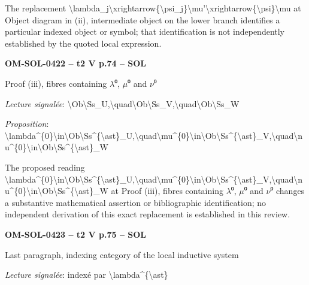 The replacement \textbackslash{}lambda\_j\textbackslash{}xrightarrow\{\textbackslash{}psi\_j\}\textbackslash{}mu'\textbackslash{}xrightarrow\{\textbackslash{}psi\}\textbackslash{}mu at Object diagram in (ii), intermediate object on the lower branch identifies a particular indexed object or symbol; that identification is not independently established by the quoted local expression.\par
\par\noindent\textbf{OM-SOL-0422 -- t2 V p.74 -- SOL}\par
Proof (iii), fibres containing \ensuremath{\lambda}⁰, \ensuremath{\mu}⁰ and \ensuremath{\nu}⁰\par
\emph{Lecture signalée}: \textbackslash{}Ob\textbackslash{}Ss\_U,\textbackslash{}quad\textbackslash{}Ob\textbackslash{}Ss\_V,\textbackslash{}quad\textbackslash{}Ob\textbackslash{}Ss\_W\par
\emph{Proposition}: \textbackslash{}lambda\textasciicircum{}\{0\}\textbackslash{}in\textbackslash{}Ob\textbackslash{}Ss\textasciicircum{}\{\textbackslash{}ast\}\_U,\textbackslash{}quad\textbackslash{}mu\textasciicircum{}\{0\}\textbackslash{}in\textbackslash{}Ob\textbackslash{}Ss\textasciicircum{}\{\textbackslash{}ast\}\_V,\textbackslash{}quad\textbackslash{}nu\textasciicircum{}\{0\}\textbackslash{}in\textbackslash{}Ob\textbackslash{}Ss\textasciicircum{}\{\textbackslash{}ast\}\_W\par
The proposed reading \textbackslash{}lambda\textasciicircum{}\{0\}\textbackslash{}in\textbackslash{}Ob\textbackslash{}Ss\textasciicircum{}\{\textbackslash{}ast\}\_U,\textbackslash{}quad\textbackslash{}mu\textasciicircum{}\{0\}\textbackslash{}in\textbackslash{}Ob\textbackslash{}Ss\textasciicircum{}\{\textbackslash{}ast\}\_V,\textbackslash{}quad\textbackslash{}nu\textasciicircum{}\{0\}\textbackslash{}in\textbackslash{}Ob\textbackslash{}Ss\textasciicircum{}\{\textbackslash{}ast\}\_W at Proof (iii), fibres containing \ensuremath{\lambda}⁰, \ensuremath{\mu}⁰ and \ensuremath{\nu}⁰ changes a substantive mathematical assertion or bibliographic identification; no independent derivation of this exact replacement is established in this review.\par
\par\noindent\textbf{OM-SOL-0423 -- t2 V p.75 -- SOL}\par
Last paragraph, indexing category of the local inductive system\par
\emph{Lecture signalée}: indexé par \textbackslash{}lambda\textasciicircum{}\{\textbackslash{}ast\}\par
